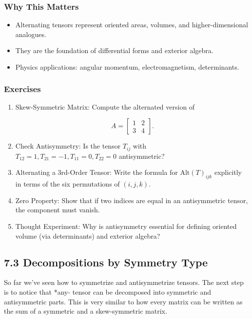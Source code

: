 \documentclass[
  letterpaper,
  DIV=11,
  numbers=noendperiod]{scrreprt}
\providecommand{\tightlist}{%
  \setlength{\itemsep}{0pt}\setlength{\parskip}{0pt}}
\begin{document}
\subsubsection{Why This Matters}\label{why-this-matters-14}

\begin{itemize}
\tightlist
\item
  Alternating tensors represent oriented areas, volumes, and
  higher-dimensional analogues.
\item
  They are the foundation of differential forms and exterior algebra.
\item
  Physics applications: angular momentum, electromagnetism,
  determinants.
\end{itemize}

\subsubsection{Exercises}\label{exercises-25}

\begin{enumerate}
\def\labelenumi{\arabic{enumi}.}
\item
  Skew-Symmetric Matrix: Compute the alternated version of

  \[
  A = \begin{bmatrix}1 & 2 \\ 3 & 4\end{bmatrix}.
  \]
\item
  Check Antisymmetry: Is the tensor \(T_{ij}\) with
  \(T_{12}=1, T_{21}=-1, T_{11}=0, T_{22}=0\) antisymmetric?
\item
  Alternating a 3rd-Order Tensor: Write the formula for
  \(\mathrm{Alt}(T)_{ijk}\) explicitly in terms of the six permutations
  of \((i,j,k)\).
\item
  Zero Property: Show that if two indices are equal in an antisymmetric
  tensor, the component must vanish.
\item
  Thought Experiment: Why is antisymmetry essential for defining
  oriented volume (via determinants) and exterior algebra?
\end{enumerate}

\subsection{7.3 Decompositions by Symmetry
Type}\label{decompositions-by-symmetry-type}

So far we've seen how to symmetrize and antisymmetrize tensors. The next
step is to notice that *any- tensor can be decomposed into symmetric and
antisymmetric parts. This is very similar to how every matrix can be
written as the sum of a symmetric and a skew-symmetric matrix.
\end{document}
